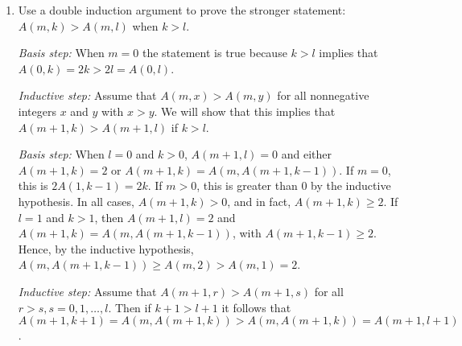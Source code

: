 \documentclass{../../cls/sig-alternate-05-2015}
\begin{document}
\begin{enumerate}
\item Use a double induction argument to prove the stronger statement:
$A(m, k) > A(m, l)$ when $k > l$.

\textit{Basis step:}
When $m = 0$ the statement is true because $k > l$ implies that $A(0, k) = 2k > 2l = A(0, l)$.

\textit{Inductive step:} Assume that $A(m, x) > A(m, y)$ for all nonnegative integers $x$ and $y$ with $x > y$.
We will show that this implies that $A(m + 1, k) > A(m + 1, l)$ if $k > l$.

\textit{Basis step:} When $l = 0$ and $k > 0$, $A(m + 1, l) = 0$ and either $A(m + 1, k) = 2$ or $A(m + 1, k) = A(m, A(m + 1, k - 1))$.
If $m = 0$, this is $2A(1, k - 1) = 2k$.
If $m > 0$,
this is greater than 0 by the inductive hypothesis.
In all cases, $A(m + 1, k) > 0$,
and in fact, $A(m + 1, k) \ge 2$.
If $l = 1$ and $k > 1$,
then $A(m + 1, l) = 2$ and $A(m + 1, k) = A(m, A(m + 1, k - 1))$,
with $A(m + 1, k - 1) \ge 2$.
Hence, by the inductive hypothesis,
$A(m, A(m + 1, k - 1)) \ge A(m, 2) > A(m, 1) = 2$.

\textit{Inductive step:} Assume that $A(m + 1, r) > A(m + 1, s)$ for all $r > s, s = 0, 1, \ldots, l$.
Then if $k + 1 > l + 1$ it follows that $A(m + 1, k + 1) = A(m, A(m + 1, k)) > A(m, A(m + 1, k)) =
A(m + 1, l + 1)$.

\end{enumerate}
\end{document}
